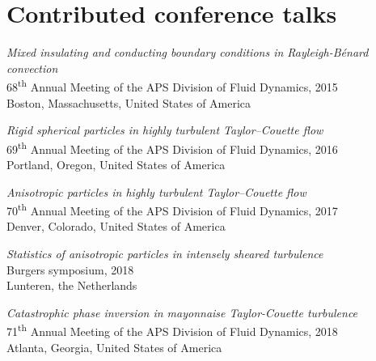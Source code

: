 \section*{Contributed conference talks}
\begin{packeditemize}
\item \textit{Mixed insulating and conducting boundary conditions in Rayleigh-B\'enard convection} \\
    68\textsuperscript{th} Annual Meeting of the APS Division of Fluid Dynamics, 2015 \\ 
    Boston, Massachusetts, United States of America
\item \textit{Rigid spherical particles in highly turbulent Taylor--Couette
    flow} \\
    69\textsuperscript{th} Annual Meeting of the APS Division of Fluid Dynamics, 2016 \\ 
    Portland, Oregon, United States of America
\newpage
\item \textit{Anisotropic particles in highly turbulent Taylor--Couette flow} \\
    70\textsuperscript{th} Annual Meeting of the APS Division of Fluid Dynamics, 2017 \\ 
    Denver, Colorado, United States of America
\item \textit{Statistics of anisotropic particles in intensely sheared turbulence} \\
    Burgers symposium, 2018\\ 
    Lunteren, the Netherlands
\item \textit{Catastrophic phase inversion in mayonnaise Taylor-Couette turbulence} \\
    71\textsuperscript{th} Annual Meeting of the APS Division of Fluid Dynamics, 2018 \\ 
    Atlanta, Georgia, United States of America
\end{packeditemize}

